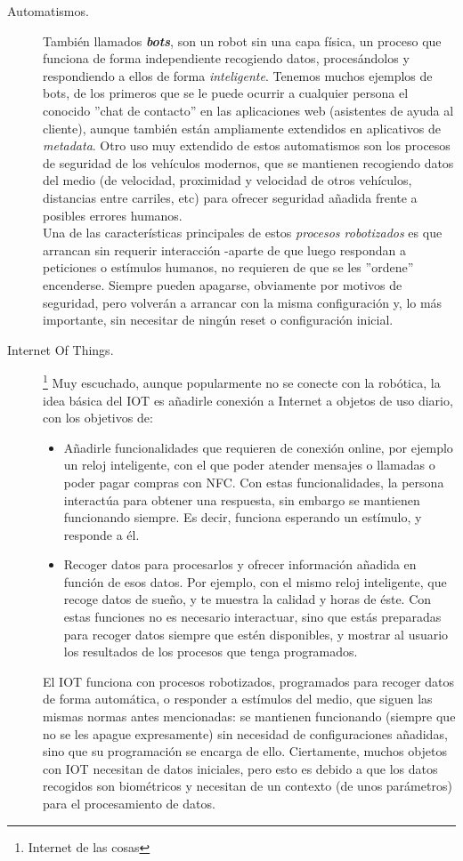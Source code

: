 \begin{description}
	\item [Automatismos.] También llamados \textit{\textbf{bots}}, son un robot sin una capa física, un proceso que funciona de forma independiente recogiendo datos, procesándolos y respondiendo a ellos de forma \textit{inteligente}. Tenemos muchos ejemplos de bots, de los primeros que se le puede ocurrir a cualquier persona el conocido ''chat de contacto'' en las aplicaciones web (asistentes de ayuda al cliente), aunque también están ampliamente extendidos en aplicativos de \textit{metadata}. Otro uso muy extendido de estos automatismos son los procesos de seguridad de los vehículos modernos, que se mantienen recogiendo datos del medio (de velocidad, proximidad y velocidad de otros vehículos, distancias entre carriles, etc) para ofrecer seguridad añadida frente a posibles errores humanos.\\
	Una de las características principales de estos \textit{procesos robotizados} es que arrancan sin requerir interacción -aparte de que luego respondan a peticiones o estímulos humanos, no requieren de que se les ''ordene'' encenderse. Siempre pueden apagarse, obviamente por motivos de seguridad, pero volverán a arrancar con la misma configuración y, lo más importante, sin necesitar de ningún reset o configuración inicial.
	\item [Internet Of Things.]\footnote{Internet de las cosas} Muy escuchado, aunque popularmente no se conecte con la robótica, la idea básica del IOT es añadirle conexión a Internet a objetos de uso diario, con los objetivos de:
	\begin{itemize}
		\item Añadirle funcionalidades que requieren de conexión online, por ejemplo un reloj inteligente, con el que poder atender mensajes o llamadas o poder pagar compras con NFC. Con estas funcionalidades, la persona interactúa para obtener una respuesta, sin embargo se mantienen funcionando siempre. Es decir, funciona esperando un estímulo, y responde a él.
		\item Recoger datos para procesarlos y ofrecer información añadida en función de esos datos. Por ejemplo, con el mismo reloj inteligente, que recoge datos de sueño, y te muestra la calidad y horas de éste. Con estas funciones no es necesario interactuar, sino que estás preparadas para recoger datos siempre que estén disponibles, y mostrar al usuario los resultados de los procesos que tenga programados.
	\end{itemize}
	El IOT funciona con procesos robotizados, programados para recoger datos de forma automática, o responder a estímulos del medio, que siguen las mismas normas antes mencionadas: se mantienen funcionando (siempre que no se les apague expresamente) sin necesidad de configuraciones añadidas, sino que su programación se encarga de ello. Ciertamente, muchos objetos con IOT necesitan de datos iniciales, pero esto es debido a que los datos recogidos son biométricos y necesitan de un contexto (de unos parámetros) para el procesamiento de datos. 

\end{description}
